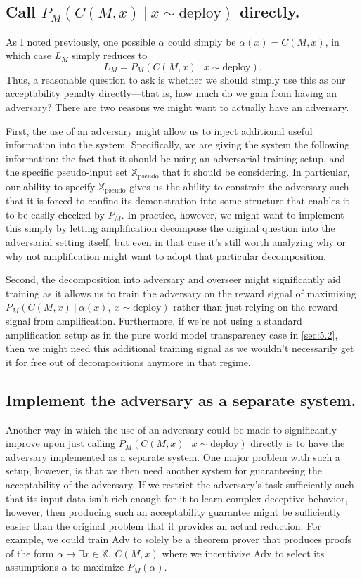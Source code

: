 \documentclass{amsart}
\begin{document}
\subsection{Call $P_M(C(M, x)\ |\ x \sim \text{deploy})$ directly.} As I noted previously, one possible $\alpha$ could simply be $\alpha(x) = C(M, x)$, in which case $L_M$ simply reduces to
\[
    L_M = P_M(C(M, x)\ |\ x \sim \text{deploy}).
\]
Thus, a reasonable question to ask is whether we should simply use this as our acceptability penalty directly---that is, how much do we gain from having an adversary? There are two reasons we might want to actually have an adversary.

First, the use of an adversary might allow us to inject additional useful information into the system. Specifically, we are giving the system the following information: the fact that it should be using an adversarial training setup, and the specific pseudo-input set $\mathbb X_\text{pseudo}$ that it should be considering. In particular, our ability to specify $\mathbb X_\text{pseudo}$ gives us the ability to constrain the adversary such that it is forced to confine its demonstration into some structure that enables it to be easily checked by $P_M$. In practice, however, we might want to implement this simply by letting amplification decompose the original question into the adversarial setting itself, but even in that case it's still worth analyzing why or why not amplification might want to adopt that particular decomposition.

Second, the decomposition into adversary and overseer might significantly aid training as it allows us to train the adversary on the reward signal of maximizing $P_M(C(M, x)\ |\ \alpha(x),~ x \sim \text{deploy})$ rather than just relying on the reward signal from amplification. Furthermore, if we're not using a standard amplification setup as in the pure world model transparency case in \autoref{sec:5.2}, then we might need this additional training signal as we wouldn't necessarily get it for free out of decompositions anymore in that regime.

\subsection{Implement the adversary as a separate system.} Another way in which the use of an adversary could be made to significantly improve upon just calling $P_M(C(M, x)\ |\ x \sim \text{deploy})$ directly is to have the adversary implemented as a separate system. One major problem with such a setup, however, is that we then need another system for guaranteeing the acceptability of the adversary. If we restrict the adversary's task sufficiently such that its input data isn't rich enough for it to learn complex deceptive behavior, however, then producing such an acceptability guarantee might be sufficiently easier than the original problem that it provides an actual reduction. For example, we could train $\text{Adv}$ to solely be a theorem prover that produces proofs of the form $\alpha \to \exists x \in \mathbb X,~ C(M, x)$ where we incentivize $\text{Adv}$ to select its assumptions $\alpha$ to maximize $P_M(\alpha)$.
\end{document}
